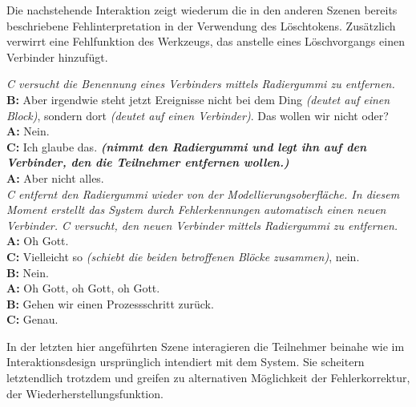 Die nachstehende Interaktion zeigt wiederum die in den anderen Szenen bereits beschriebene Fehlinterpretation in der Verwendung des Löschtokens. Zusätzlich verwirrt eine Fehlfunktion des Werkzeugs, das anstelle eines Löschvorgangs einen Verbinder hinzufügt.

\begin{transkript}
	\emph{C versucht die Benennung eines Verbinders mittels Radiergummi zu entfernen.}\\
	\textbf{B:} Aber irgendwie steht jetzt Ereignisse nicht bei dem Ding \emph{(deutet auf einen Block)}, sondern dort \emph{(deutet auf einen Verbinder)}. Das wollen wir nicht oder?\\
	\textbf{A:} Nein.\\
	\textbf{C:} Ich glaube das. \emph{\textbf{(nimmt den Radiergummi und legt ihn auf den Verbinder, den die Teilnehmer entfernen wollen.)}}\\
	\textbf{A:} Aber nicht alles.\\
	\emph{C entfernt den Radiergummi wieder von der Modellierungsoberfläche. In diesem Moment erstellt das System durch Fehlerkennungen automatisch einen neuen Verbinder. C versucht, den neuen Verbinder mittels Radiergummi zu entfernen.}\\
	\textbf{A:} Oh Gott.\\
	\textbf{C:} Vielleicht so \emph{(schiebt die beiden betroffenen Blöcke zusammen)}, nein.\\
	\textbf{B:} Nein.\\
	\textbf{A:} Oh Gott, oh Gott, oh Gott.\\
	\textbf{B:} Gehen wir einen Prozessschritt zurück.\\
	\textbf{C:} Genau.\\
\end{transkript}

In der letzten hier angeführten Szene interagieren die Teilnehmer beinahe wie im Interaktionsdesign ursprünglich intendiert mit dem System. Sie scheitern letztendlich trotzdem und greifen zu alternativen Möglichkeit der Fehlerkorrektur, der Wiederherstellungsfunktion.

